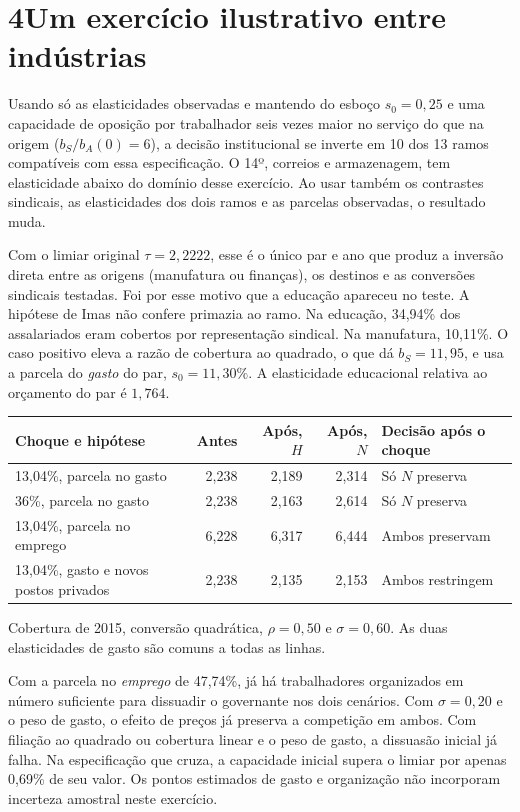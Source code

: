 \documentclass[11pt,a4paper]{article}
\newcommand{\titulo}[1]{\section*{\color{tinta}#1}}
\newcommand{\subtitulo}[1]{\par\smallskip{\large\bfseries\color{azul}#1\par}\nobreak}
\begin{document}
\newpage
\titulo{4\quad Um exercício ilustrativo entre indústrias}
Usando só as elasticidades observadas e mantendo do esboço \(s_0=0{,}25\) e uma capacidade de oposição por trabalhador seis vezes maior no serviço do que na origem (\(b_S/b_A(0)=6\)), a decisão institucional se inverte em 10 dos 13 ramos compatíveis com essa especificação. O 14º, correios e armazenagem, tem elasticidade abaixo do domínio desse exercício. Ao usar também os contrastes sindicais, as elasticidades dos dois ramos e as parcelas observadas, o resultado muda.

\subtitulo{Manufatura e educação em 2015}
Com o limiar original \(\tau=2{,}2222\), esse é o único par e ano que produz a inversão direta entre as origens (manufatura ou finanças), os destinos e as conversões sindicais testadas. Foi por esse motivo que a educação apareceu no teste. A hipótese de Imas não confere primazia ao ramo. Na educação, 34,94\% dos assalariados eram cobertos por representação sindical. Na manufatura, 10,11\%. O caso positivo eleva a razão de cobertura ao quadrado, o que dá \(b_S=11{,}95\), e usa a parcela do \emph{gasto} do par, \(s_0=11{,}30\%\). A elasticidade educacional relativa ao orçamento do par é \(1{,}764\).

\begin{center}
\small\renewcommand{\arraystretch}{1.16}\setlength{\tabcolsep}{4pt}
\begin{tabular}{@{}lrrrl@{}}\toprule
Choque e hipótese & Antes & Após, \(H\) & Após, \(N\) & Decisão após o choque\\\midrule
13,04\%, parcela no gasto & 2,238 & 2,189 & 2,314 & Só \(N\) preserva\\
36\%, parcela no gasto & 2,238 & 2,163 & 2,614 & Só \(N\) preserva\\
13,04\%, parcela no emprego & 6,228 & 6,317 & 6,444 & Ambos preservam\\
13,04\%, gasto e novos postos privados & 2,238 & 2,135 & 2,153 & Ambos restringem\\\bottomrule
\end{tabular}
\end{center}
{\small Cobertura de 2015, conversão quadrática, \(\rho=0{,}50\) e \(\sigma=0{,}60\). As duas elasticidades de gasto são comuns a todas as linhas.}

Com a parcela no \emph{emprego} de 47,74\%, já há trabalhadores organizados em número suficiente para dissuadir o governante nos dois cenários. Com \(\sigma=0{,}20\) e o peso de gasto, o efeito de preços já preserva a competição em ambos. Com filiação ao quadrado ou cobertura linear e o peso de gasto, a dissuasão inicial já falha. Na especificação que cruza, a capacidade inicial supera o limiar por apenas 0,69\% de seu valor. Os pontos estimados de gasto e organização não incorporam incerteza amostral neste exercício.
\end{document}
